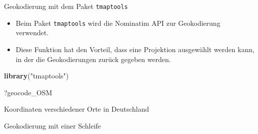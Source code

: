 \documentclass[ignorenonframetext,]{beamer}
\newenvironment{Shaded}{\begin{snugshade}}{\end{snugshade}}
\newcommand{\ControlFlowTok}[1]{\textcolor[rgb]{0.26,0.66,0.93}{\textbf{#1}}}
\newcommand{\DecValTok}[1]{\textcolor[rgb]{0.27,0.67,0.26}{#1}}
\newcommand{\KeywordTok}[1]{\textcolor[rgb]{0.26,0.66,0.93}{\textbf{#1}}}
\newcommand{\NormalTok}[1]{\textcolor[rgb]{0.74,0.68,0.62}{#1}}
\newcommand{\OperatorTok}[1]{\textcolor[rgb]{0.74,0.68,0.62}{#1}}
\newcommand{\StringTok}[1]{\textcolor[rgb]{0.02,0.61,0.04}{#1}}
\providecommand{\tightlist}{%
  \setlength{\itemsep}{0pt}\setlength{\parskip}{0pt}}
\begin{document}
\begin{frame}[fragile]{Geokodierung mit dem Paket \texttt{tmaptools}}
\protect\hypertarget{geokodierung-mit-dem-paket-tmaptools}{}

\begin{itemize}
\tightlist
\item
  Beim Paket \texttt{tmaptools} wird die Nominatim API zur Geokodierung
  verwendet.
\item
  Diese Funktion hat den Vorteil, dass eine Projektion ausgewählt werden
  kann, in der die Geokodierungen zurück gegeben werden.
\end{itemize}

\begin{Shaded}
\begin{Highlighting}[]
\KeywordTok{library}\NormalTok{(}\StringTok{"tmaptools"}\NormalTok{)}
\end{Highlighting}
\end{Shaded}

\begin{Shaded}
\begin{Highlighting}[]
\NormalTok{?geocode_OSM}
\end{Highlighting}
\end{Shaded}

\end{frame}

\begin{frame}[fragile]{Koordinaten verschiedener Orte in Deutschland}
\protect\hypertarget{koordinaten-verschiedener-orte-in-deutschland}{}

\begin{block}{Geokodierung mit einer Schleife}

\begin{Shaded}
\end{Shaded}

\end{block}

\end{frame}
\end{document}
